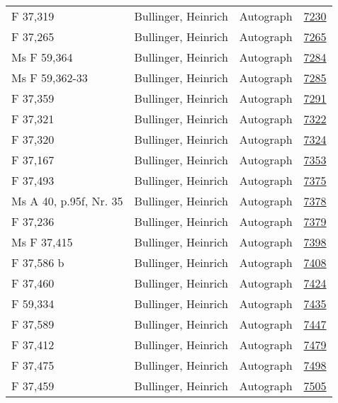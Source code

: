 \documentclass[10pt,a4paper,landscape]{report}
\begin{document}
\begin{longtable}{p{16cm}p{4cm}lr}
F 37,319	&	Bullinger, Heinrich	&	Autograph	&	\href{http://130.60.24.72/assignment/7230}{7230}\\
F 37,265	&	Bullinger, Heinrich	&	Autograph	&	\href{http://130.60.24.72/assignment/7265}{7265}\\
Ms F 59,364	&	Bullinger, Heinrich	&	Autograph	&	\href{http://130.60.24.72/assignment/7284}{7284}\\
Ms F 59,362-33	&	Bullinger, Heinrich	&	Autograph	&	\href{http://130.60.24.72/assignment/7285}{7285}\\
F 37,359	&	Bullinger, Heinrich	&	Autograph	&	\href{http://130.60.24.72/assignment/7291}{7291}\\
F 37,321	&	Bullinger, Heinrich	&	Autograph	&	\href{http://130.60.24.72/assignment/7322}{7322}\\
F 37,320	&	Bullinger, Heinrich	&	Autograph	&	\href{http://130.60.24.72/assignment/7324}{7324}\\
F 37,167	&	Bullinger, Heinrich	&	Autograph	&	\href{http://130.60.24.72/assignment/7353}{7353}\\
F 37,493	&	Bullinger, Heinrich	&	Autograph	&	\href{http://130.60.24.72/assignment/7375}{7375}\\
Ms A 40, p.95f, Nr. 35	&	Bullinger, Heinrich	&	Autograph	&	\href{http://130.60.24.72/assignment/7378}{7378}\\
F 37,236	&	Bullinger, Heinrich	&	Autograph	&	\href{http://130.60.24.72/assignment/7379}{7379}\\
Ms F 37,415	&	Bullinger, Heinrich	&	Autograph	&	\href{http://130.60.24.72/assignment/7398}{7398}\\
F 37,586 b	&	Bullinger, Heinrich	&	Autograph	&	\href{http://130.60.24.72/assignment/7408}{7408}\\
F 37,460	&	Bullinger, Heinrich	&	Autograph	&	\href{http://130.60.24.72/assignment/7424}{7424}\\
F 59,334	&	Bullinger, Heinrich	&	Autograph	&	\href{http://130.60.24.72/assignment/7435}{7435}\\
F 37,589	&	Bullinger, Heinrich	&	Autograph	&	\href{http://130.60.24.72/assignment/7447}{7447}\\
F 37,412	&	Bullinger, Heinrich	&	Autograph	&	\href{http://130.60.24.72/assignment/7479}{7479}\\
F 37,475	&	Bullinger, Heinrich	&	Autograph	&	\href{http://130.60.24.72/assignment/7498}{7498}\\
F 37,459	&	Bullinger, Heinrich	&	Autograph	&	\href{http://130.60.24.72/assignment/7505}{7505}\\

\end{longtable}
\end{document}
